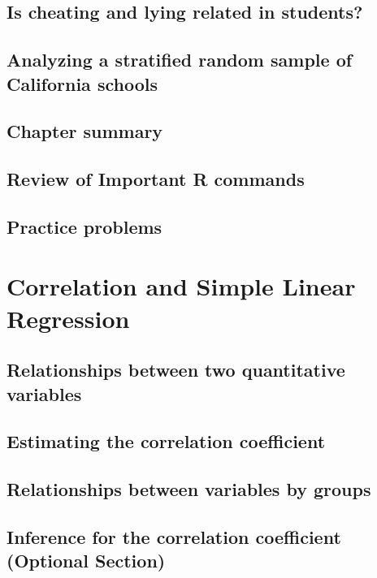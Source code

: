 \documentclass[]{book}
\begin{document}
{{\section{Is cheating and lying related in students?}\label{section5-10}

\section{Analyzing a stratified random sample of California
schools}\label{section5-11}

\section{Chapter summary}\label{section5-12}

\section{Review of Important R commands}\label{section5-13}

\section{Practice problems}\label{section5-14}

\chapter{Correlation and Simple Linear Regression}\label{chapter6}

\section{Relationships between two quantitative
variables}\label{section6-1}

\section{Estimating the correlation coefficient}\label{section6-2}

\section{Relationships between variables by groups}\label{section6-3}

\section{Inference for the correlation coefficient (Optional
Section)}\label{section6-4}

}}
\end{document}
